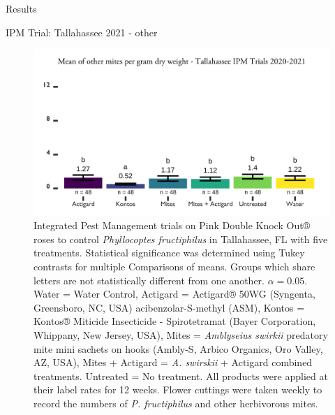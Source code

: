 \documentclass[
  ignorenonframetext,
]{beamer}
\begin{document}
\begin{frame}{Results}
\begin{block}{IPM Trial: Tallahassee 2021 - other}
\protect\hypertarget{ipm-trial-tallahassee-2021---other}{}
\begin{figure}
\includegraphics[width=0.8\linewidth]{figure/rrv_ipm_graph_other_talla} \caption{Integrated Pest Management trials on Pink Double Knock Out® roses to control \textit{Phyllocoptes fructiphilus} in Tallahassee, FL with five treatments. Statistical significance was determined using Tukey contrasts for multiple Comparisons of means. Groups which share letters are not statistically different from one another. $\alpha = 0.05$. Water = Water Control, Actigard = Actigard® 50WG (Syngenta, Greensboro, NC, USA) acibenzolar-S-methyl (ASM), Kontos = Kontos® Miticide Insecticide - Spirotetramat (Bayer Corporation, Whippany, New Jersey, USA), Mites = \textit{Amblyseius swirkii} predatory mite mini sachets on hooks (Ambly-S, Arbico Organics, Oro Valley, AZ, USA), Mites + Actigard = \textit{A. swirskii} + Actigard combined treatments. Untreated = No treatment. All products were applied at their label rates for 12 weeks. Flower cuttings were taken weekly to record the numbers of \textit{P. fructiphilus} and other herbivorous mites.}\label{fig:ipm-talla-other}
\end{figure}
\end{block}
\end{frame}
\end{document}
